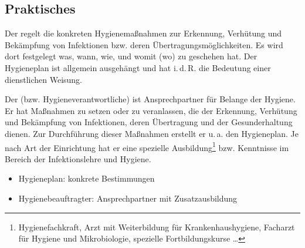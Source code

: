 \subsection{Praktisches}

{%
\label{topic:hygieneplan}
Der  regelt die konkreten Hygienemaßnahmen
zur Erkennung, Verhütung und Bekämpfung von Infektionen bzw.
deren Übertragungsmöglichkeiten. Es wird dort festgelegt
was, wann, wie, und womit (wo) zu geschehen hat. Der
Hygieneplan ist allgemein ausgehängt und hat i.\,d.\,R. die
Bedeutung einer dienstlichen Weisung.

Der   (bzw. Hygieneverantwortliche)
ist Ansprechpartner für Belange der Hygiene. Er hat
Maßnahmen zu setzen oder zu veranlassen, die der Erkennung,
Verhütung und Bekämpfung von Infektionen, deren Übertragung
und der Gesunderhaltung dienen. Zur Durchführung dieser
Maßnahmen erstellt er u.\,a. den Hygieneplan. Je nach Art
der Einrichtung hat er eine spezielle
Ausbildung\footnote{Hygienefachkraft, Arzt mit Weiterbildung
für Krankenhaushygiene, Facharzt für Hygiene und
Mikrobiologie, spezielle Fortbildungskurse \ldots{}} bzw.
Kenntnisse im Bereich der Infektionslehre und Hygiene.



}
{
\begin{itemize}
  \item Hygieneplan: konkrete Bestimmungen
  \item Hygienebeauftragter: Ansprechpartner mit Zusatzausbildung
\end{itemize}
}{}{}{}


